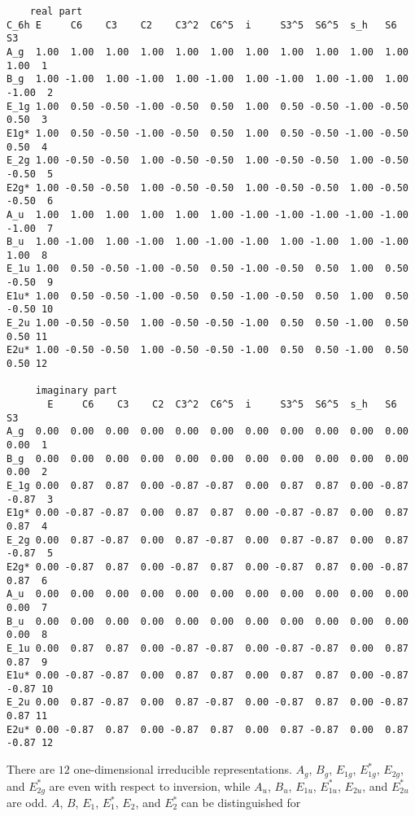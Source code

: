 \documentclass[12pt,a4paper]{article}
\begin{document}
\begin{footnotesize}
\begin{verbatim}
    real part
C_6h E     C6    C3    C2    C3^2  C6^5  i     S3^5  S6^5  s_h   S6    S3   
A_g  1.00  1.00  1.00  1.00  1.00  1.00  1.00  1.00  1.00  1.00  1.00  1.00  1
B_g  1.00 -1.00  1.00 -1.00  1.00 -1.00  1.00 -1.00  1.00 -1.00  1.00 -1.00  2
E_1g 1.00  0.50 -0.50 -1.00 -0.50  0.50  1.00  0.50 -0.50 -1.00 -0.50  0.50  3
E1g* 1.00  0.50 -0.50 -1.00 -0.50  0.50  1.00  0.50 -0.50 -1.00 -0.50  0.50  4
E_2g 1.00 -0.50 -0.50  1.00 -0.50 -0.50  1.00 -0.50 -0.50  1.00 -0.50 -0.50  5
E2g* 1.00 -0.50 -0.50  1.00 -0.50 -0.50  1.00 -0.50 -0.50  1.00 -0.50 -0.50  6
A_u  1.00  1.00  1.00  1.00  1.00  1.00 -1.00 -1.00 -1.00 -1.00 -1.00 -1.00  7
B_u  1.00 -1.00  1.00 -1.00  1.00 -1.00 -1.00  1.00 -1.00  1.00 -1.00  1.00  8
E_1u 1.00  0.50 -0.50 -1.00 -0.50  0.50 -1.00 -0.50  0.50  1.00  0.50 -0.50  9
E1u* 1.00  0.50 -0.50 -1.00 -0.50  0.50 -1.00 -0.50  0.50  1.00  0.50 -0.50 10
E_2u 1.00 -0.50 -0.50  1.00 -0.50 -0.50 -1.00  0.50  0.50 -1.00  0.50  0.50 11
E2u* 1.00 -0.50 -0.50  1.00 -0.50 -0.50 -1.00  0.50  0.50 -1.00  0.50  0.50 12

     imaginary part
       E     C6    C3    C2  C3^2  C6^5  i     S3^5  S6^5  s_h   S6    S3   
A_g  0.00  0.00  0.00  0.00  0.00  0.00  0.00  0.00  0.00  0.00  0.00  0.00  1
B_g  0.00  0.00  0.00  0.00  0.00  0.00  0.00  0.00  0.00  0.00  0.00  0.00  2
E_1g 0.00  0.87  0.87  0.00 -0.87 -0.87  0.00  0.87  0.87  0.00 -0.87 -0.87  3
E1g* 0.00 -0.87 -0.87  0.00  0.87  0.87  0.00 -0.87 -0.87  0.00  0.87  0.87  4
E_2g 0.00  0.87 -0.87  0.00  0.87 -0.87  0.00  0.87 -0.87  0.00  0.87 -0.87  5
E2g* 0.00 -0.87  0.87  0.00 -0.87  0.87  0.00 -0.87  0.87  0.00 -0.87  0.87  6
A_u  0.00  0.00  0.00  0.00  0.00  0.00  0.00  0.00  0.00  0.00  0.00  0.00  7
B_u  0.00  0.00  0.00  0.00  0.00  0.00  0.00  0.00  0.00  0.00  0.00  0.00  8
E_1u 0.00  0.87  0.87  0.00 -0.87 -0.87  0.00 -0.87 -0.87  0.00  0.87  0.87  9
E1u* 0.00 -0.87 -0.87  0.00  0.87  0.87  0.00  0.87  0.87  0.00 -0.87 -0.87 10
E_2u 0.00  0.87 -0.87  0.00  0.87 -0.87  0.00 -0.87  0.87  0.00 -0.87  0.87 11
E2u* 0.00 -0.87  0.87  0.00 -0.87  0.87  0.00  0.87 -0.87  0.00  0.87 -0.87 12
\end{verbatim}
\end{footnotesize}
There are $12$ one-dimensional irreducible representations. $A_g$, 
$B_g$, $E_{1g}$, $E_{1g}^*$, $E_{2g}$, and $E_{2g}^*$ are even with respect to
inversion, while $A_u$, $B_u$, $E_{1u}$, $E_{1u}^*$, $E_{2u}$, and $E_{2u}^*$
are odd. $A$, $B$, $E_1$, $E_1^*$, $E_2$, and $E_2^*$ can be distinguished for
\end{document}
